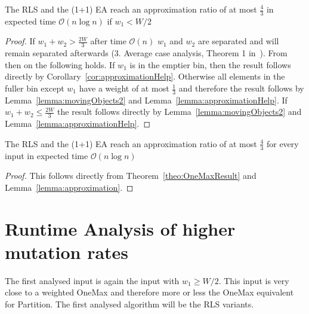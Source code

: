 \begin{lemma}\label{lemma:approximation}
    The RLS and the (1+1) EA reach an approximation ratio of at most $\frac{4}{3}$ in expected time $\mathcal{O}(n\log{}n)$ if $w_1 < W/2$
\end{lemma}
\begin{proof}
    If \(w_1+w_2 > \frac{2W}{3}\) after time $\mathcal{O}(n)$ $w_1$ and $w_2$ are separated and will remain separated afterwards (3. Average case analysis, Theorem 1 in~\cite{witt2005worst}).
    From then on the following holds.
    If $w_1$ is in the emptier bin, then the result follows directly by Corollary~\ref{cor:approximationHelp}.
    Otherwise all elements in the fuller bin except $w_1$ have a weight of at most $\frac{1}{3}$ and therefore the result follows by Lemma~\ref{lemma:movingObjects2} and Lemma~\ref{lemma:approximationHelp}.
    If \(w_1+w_2 \le \frac{2W}{3}\) the result follows directly by Lemma~\ref{lemma:movingObjects2} and Lemma~\ref{lemma:approximationHelp}.
\end{proof}

\begin{corollary}
    The RLS and the (1+1) EA reach an approximation ratio of at most $\frac{4}{3}$ for every input in expected time $\mathcal{O}(n\log{}n)$
\end{corollary}
\begin{proof}
    This follows directly from Theorem~\ref{theo:OneMaxResult} and Lemma~\ref{lemma:approximation}.
\end{proof}

\section{Runtime Analysis of higher mutation rates}

The first analysed input is again the input with $w_1\ge W/2$.
This input is very close to a weighted OneMax and therefore more or less the OneMax equivalent for Partition.
The first analysed algorithm will be the RLS variants.

